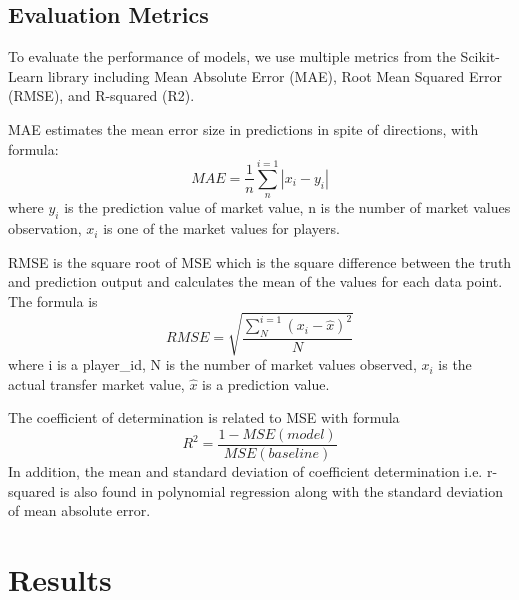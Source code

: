 \documentclass[conference]{IEEEtran}
\begin{document}
\subsection{Evaluation Metrics}
To evaluate the performance of models, we use multiple metrics from the Scikit-Learn library including Mean Absolute Error (MAE), Root Mean Squared Error (RMSE), and R-squared (R2).\par
MAE estimates the mean error size in predictions in spite of directions, with formula:
\begin{equation}
MAE = \frac{1}{n}\sum_{n}^{i=1}\left| x_{i}-y_{i}\right|
\end{equation}
where \(y_{i}\) is the prediction value of market value, n is the number of market values observation, \(x_{i}\) is one of the market values for players.\cite{b6} \par
RMSE is the square root of MSE which is the square difference between the truth and prediction output and calculates the mean of the values for each data point. The formula is
\begin{equation}
RMSE = \sqrt{\frac{\sum_{N}^{i=1}(x_{i}-\hat{x})^2}{N}}
\end{equation}
where i is a player\_id, N is the number of market values observed, \(x_{i}\) is the actual transfer market value, \(\hat{x}\) is a prediction value. \cite{b7} \par

The coefficient of determination is related to MSE with formula
\begin{equation}
R^{2} = \frac{1-MSE(model)}{MSE(baseline)}
\end{equation}
In addition, the mean and standard deviation of coefficient determination i.e. r-squared is also found in polynomial regression along with the standard deviation of mean absolute error.





\section{Results}
\end{document}
